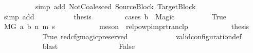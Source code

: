 \begin{isabellebody}
\ \ \ \ \ \ \ \ \isamarkupfalse%
\ {\isacharparenleft}{\kern0pt}simp\ add{\isacharcolon}{\kern0pt}\ NotCoalesced\ SourceBlock\ TargetBlock{\isacharparenright}{\kern0pt}\isanewline
\ \ \ \ \ \ \ \ \isamarkupfalse%
\ {\isacharparenleft}{\kern0pt}simp\ add{\isacharcolon}{\kern0pt}\ {\isachardoublequoteopen}{}{\isachardoublequoteclose}{\isacharparenleft}{\kern0pt}{}{\isacharparenright}{\kern0pt}{\isacharparenright}{\kern0pt}\isanewline
\ \ \ \ \ \ \isamarkupfalse%
\ \isamarkupfalse%
\ {\isacharquery}{\kern0pt}thesis\ \isanewline
\ \ \ \ \ \ \isamarkupfalse%
\ {\isacharparenleft}{\kern0pt}cases\ {\isachardoublequoteopen}b\ {\isacharequal}{\kern0pt}\ Magic{\isachardoublequoteclose}{\isacharparenright}{\kern0pt}\isanewline
\ \ \ \ \ \ \ \ \isamarkupfalse%
\ True\isanewline
\ \ \ \ \ \ \ \ \isamarkupfalse%
\ {\isachardoublequoteopen}M{\isacharcomma}{\kern0pt}{\isasymLambda}{\isacharcomma}{\kern0pt}{\isasymGamma}{\isacharcomma}{\kern0pt}{\isasymOmega}{\isacharcomma}{\kern0pt}G\ {\isasymturnstile}{\isacharparenleft}{\kern0pt}a{\isacharcomma}{\kern0pt}\ b{\isacharparenright}{\kern0pt}\ {\isacharminus}{\kern0pt}n{\isasymrightarrow}{\isacharasterisk}{\kern0pt}\ {\isacharparenleft}{\kern0pt}m{\isacharprime}{\kern0pt}{\isacharcomma}{\kern0pt}\ s{\isacharprime}{\kern0pt}{\isacharparenright}{\kern0pt}{\isachardoublequoteclose}\isanewline
\ \ \ \ \ \ \ \ \ \ \isamarkupfalse%
\ {\isacharparenleft}{\kern0pt}meson\ {\isachardoublequoteopen}{}{\isachardoublequoteclose}{\isacharparenleft}{\kern0pt}{}{\isacharparenright}{\kern0pt}\ relpowp{\isacharunderscore}{\kern0pt}imp{\isacharunderscore}{\kern0pt}rtranclp{\isacharparenright}{\kern0pt}\isanewline
\ \ \ \ \ \ \ \ \isamarkupfalse%
\ \isamarkupfalse%
\ {\isacharquery}{\kern0pt}thesis\isanewline
\ \ \ \ \ \ \ \ \ \ \isamarkupfalse%
\ True\ red{\isacharunderscore}{\kern0pt}cfg{\isacharunderscore}{\kern0pt}magic{\isacharunderscore}{\kern0pt}preserved\ \isanewline
\ \ \ \ \ \ \ \ \ \ \isamarkupfalse%
\ valid{\isacharunderscore}{\kern0pt}configuration{\isacharunderscore}{\kern0pt}def\isanewline
\ \ \ \ \ \ \ \ \ \ \isamarkupfalse%
\ blast\isanewline
\ \ \ \ \ \ \isamarkupfalse%
\isanewline
\ \ \ \ \ \ \ \ \isamarkupfalse%
\ False\isanewline
\ \ \ \ \ \ \ \ \isamarkupfalse%

\end{isabellebody}
